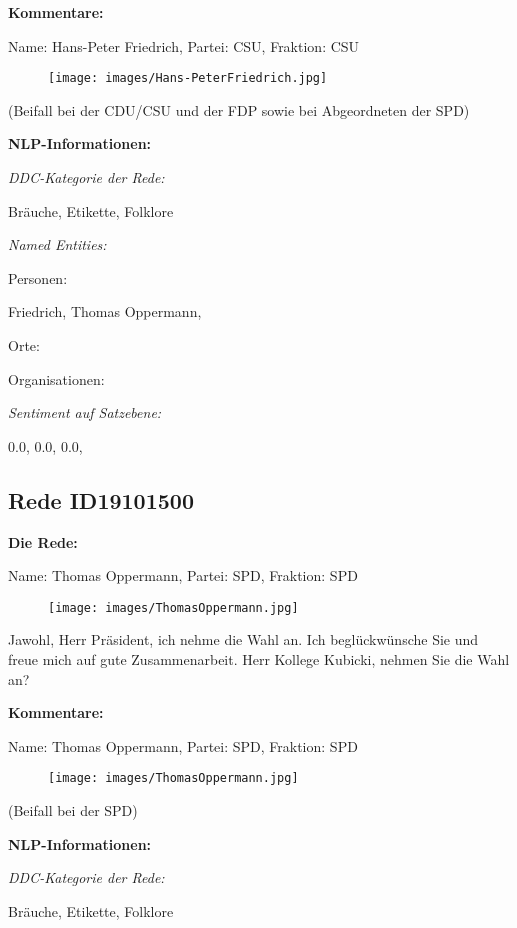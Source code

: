 \documentclass[10pt, a4paper]{report}
\begin{document}
\textbf{Kommentare:}

Name: Hans-Peter Friedrich, Partei: CSU, Fraktion: CSU

\begin{figure}[!ht]
\texttt{[image: images/Hans-PeterFriedrich.jpg]}
\end{figure}


(Beifall bei der CDU/CSU und der FDP sowie bei Abgeordneten der SPD)


\textbf{NLP-Informationen:}

\textit{DDC-Kategorie der Rede:}

Bräuche, Etikette, Folklore

\textit{Named Entities:}

Personen:

Friedrich, Thomas Oppermann, 

Orte:



Organisationen:



\textit{Sentiment auf Satzebene:}

0.0, 0.0, 0.0, 
\subsection{Rede ID19101500}

\textbf{Die Rede:}

Name: Thomas Oppermann, Partei: SPD, Fraktion: SPD

\begin{figure}[!ht]
\texttt{[image: images/ThomasOppermann.jpg]}
\end{figure}


Jawohl, Herr Präsident, ich nehme die Wahl an. Ich beglückwünsche Sie und freue mich auf gute Zusammenarbeit. Herr Kollege Kubicki, nehmen Sie die Wahl an? 

\textbf{Kommentare:}

Name: Thomas Oppermann, Partei: SPD, Fraktion: SPD

\begin{figure}[!ht]
\texttt{[image: images/ThomasOppermann.jpg]}
\end{figure}


(Beifall bei der SPD)


\textbf{NLP-Informationen:}

\textit{DDC-Kategorie der Rede:}

Bräuche, Etikette, Folklore
\end{document}
